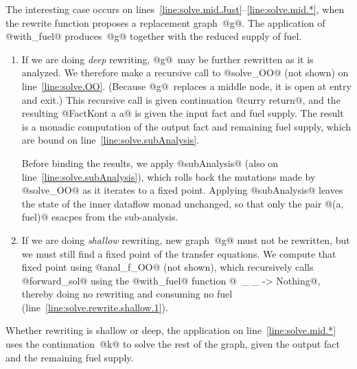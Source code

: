 \documentclass[blockstyle,preprint,natbib,nocopyrightspace]{sigplanconf}
\newcommand\lineref[1]{line~\ref{line:#1}}
\newcommand\linerangeref[2]{\mbox{lines~\ref{line:#1}--\ref{line:#2}}}
\begin{document}
The interesting case occurs on \linerangeref{solve.mid.Just}{solve.mid.*},
when the rewrite function 
proposes a replacement graph~@g@.
The application of @with_fuel@ produces~@g@ together with the reduced
supply of fuel.
\begin{enumerate}
\item
If we are doing \emph{deep} rewriting, @g@~may be further rewritten as
it is analyzed.
We therefore make a recursive call to @solve_OO@ (not shown) on
\lineref{solve.OO}.
(Because @g@~replaces a middle node, it is open at entry and exit.)
This recursive call is given continuation @curry return@, and the
resulting @FactKont a a@ is given
the input fact and fuel supply.
The result is a monadic computation of the output fact and remaining
fuel supply, which are bound on \lineref{solve.subAnalysis}.

Before binding the results, we apply @subAnalysis@ (also on
\lineref{solve.subAnalysis}), which rolls back the mutations
made by @solve_OO@ as it iterates to a fixed point.
Applying @subAnalysis@ leaves the state of the inner dataflow monad
unchanged, so that only the pair @(a, fuel)@ esacpes from the sub-analysis.
\item
If we are doing \emph{shallow} rewriting,  new graph~@g@ must not be
rewritten, but we must still find a fixed point of the transfer
equations.
We compute that fixed point using @anal_f_OO@ (not shown), which  recursively calls
@forward_sol@ using the @with_fuel@ function
@\ _ _ -> Nothing@, 
thereby doing no rewriting and consuming no fuel
(\lineref{solve.rewrite.shallow.1}).
\end{enumerate}
Whether rewriting is shallow or deep, the application on
\lineref{solve.mid.*} uses the continuation~@k@ to solve the rest of
the graph, given the output fact and the remaining fuel supply.



\end{document}

